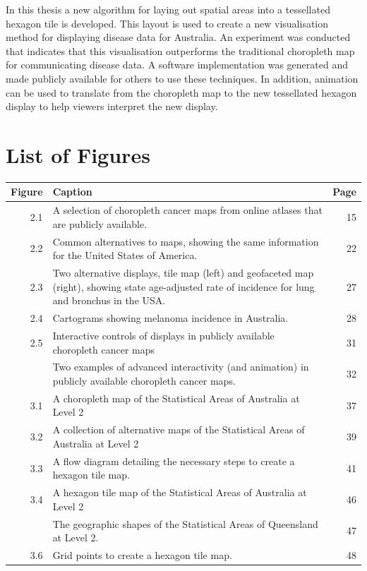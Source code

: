 \documentclass{monashthesis}
\begin{document}
In this thesis a new algorithm for laying out spatial areas into a tessellated hexagon tile is developed. This layout is used to create a new visualisation method for displaying disease data for Australia.
An experiment was conducted that indicates that this visualisation outperforms the traditional choropleth map for communicating disease data.
A software implementation was generated and made publicly available for others to use these techniques. In addition, animation can be used to translate from the choropleth map to the new tessellated hexagon display to help viewers interpret the new display.

\newpage

\hypertarget{list-of-figures}{%
\chapter*{List of Figures}\label{list-of-figures}}

\begin{tabular}{r>{\raggedright\arraybackslash}p{30em}r}
\toprule
Figure & Caption & Page\\
\midrule
2.1 & A selection of choropleth cancer maps from online atlases that are publicly available. & 15\\
2.2 & Common alternatives to maps, showing the same information for the United States of America. & 22\\
2.3 & Two alternative displays, tile map (left) and geofaceted map (right), showing state age-adjusted rate of incidence for lung and bronchus in the USA. & 27\\
2.4 & Cartograms showing melanoma incidence in Australia. & 28\\
2.5 & Interactive controls of displays in publicly available choropleth cancer maps & 31\\
\addlinespace
2.6 & Two examples of advanced interactivity (and animation) in publicly available choropleth cancer maps. & 32\\
3.1 & A choropleth map of the Statistical Areas of Australia at Level 2 & 37\\
3.2 & A collection of alternative maps of the Statistical Areas of Australia at Level 2 & 39\\
3.3 & A flow diagram detailing the necessary steps to create a hexagon tile map. & 41\\
3.4 & A hexagon tile map of the Statistical Areas of Australia at Level 2 & 46\\
\addlinespace
3.5 & The geographic shapes of the Statistical Areas of Queensland at Level 2. & 47\\
3.6 & Grid points to create a hexagon tile map. & 48\\
\bottomrule
\end{tabular}
\end{document}
